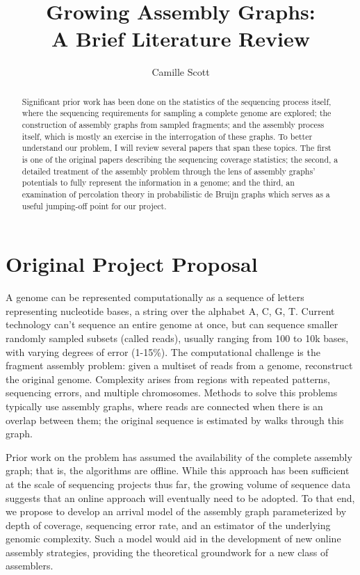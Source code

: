 \documentclass[]{article}
\title{Growing Assembly Graphs:\\
	   A Brief Literature Review}
\author{Camille Scott}
\begin{document}
\maketitle

\begin{abstract}
Significant prior work has been done on the statistics
of the sequencing process itself, where the sequencing requirements for sampling
a complete genome are explored; the construction of assembly graphs from sampled 
fragments; and the assembly process itself, which is mostly an exercise in the 
interrogation of these graphs. To better understand our problem, I will review several 
papers that span these topics. The first is one of the original papers describing the
sequencing coverage statistics; the second, a 
detailed treatment of the assembly problem through the lens of assembly
graphs' potentials to fully represent the information in a genome; and the third, an 
examination of percolation theory in probabilistic de Bruijn graphs which serves as a 
useful jumping-off point for our project.
\end{abstract}

\section{Original Project Proposal}



A genome can be represented computationally as a sequence of letters representing 
nucleotide bases, a string over the alphabet {A, C, G, T}. Current technology can’t 
sequence an entire genome at once, but can sequence smaller randomly sampled subsets 
(called reads), usually ranging from 100 to 10k bases, with varying degrees of error 
(1-15\%). The computational challenge is the fragment assembly problem: given a multiset 
of reads from a genome, reconstruct the original genome. Complexity arises from regions 
with repeated patterns, sequencing errors, and multiple chromosomes. Methods to solve 
this problems typically use assembly graphs, where reads are connected when there is an 
overlap between them; the original sequence is estimated by walks through this graph. 

Prior work on the problem has assumed the availability of the complete assembly graph; 
that is, the algorithms are offline. While this approach has been sufficient at the scale 
of sequencing projects thus far, the growing volume of sequence data suggests that an 
online approach will eventually need to be adopted. To that end, we propose to develop an 
arrival model of the assembly graph parameterized by depth of coverage, sequencing error 
rate, and an estimator of the underlying genomic complexity. Such a model would aid in 
the development of new online assembly strategies, providing the theoretical groundwork 
for a new class of assemblers.
\end{document}
